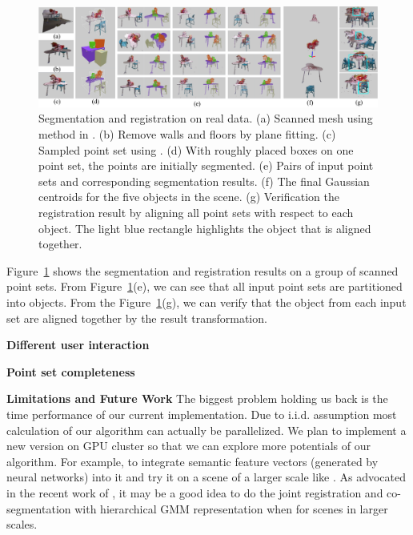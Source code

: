 \begin{figure}[htb]
	\centering
	\includegraphics[width=\linewidth]{images/realdata/realdata}
	\caption{\label{fig:realdata} Segmentation and registration on real data. (a) Scanned mesh using method in \cite{VXH}. (b) Remove walls and floors by plane fitting. (c) Sampled point set using \cite{PossionSampling}. (d) With roughly placed boxes on one point set, the points are initially segmented.  (e) Pairs of input point sets and corresponding segmentation results. (f) The final Gaussian centroids for the five objects in the scene. (g) Verification the registration result by aligning all point sets with respect to each object. The light blue rectangle highlights the object that is aligned together.   }
\end{figure}


Figure~{\ref{fig:realdata}} shows the segmentation and registration results on a group of scanned point sets.
From Figure~\ref{fig:realdata}(e), we can see that all input point sets are partitioned into objects. From the Figure~\ref{fig:realdata}(g), we can verify that the object from each input set are aligned together by the result transformation.  


\textbf{Different user interaction}

\textbf{Point set completeness}

 
\noindent\textbf{Limitations and Future Work}
The biggest problem holding us back is the time performance of our current implementation.  Due to i.i.d. assumption most calculation of our algorithm can actually be parallelized. We plan to implement a new version on GPU cluster so that we can explore more potentials of our algorithm. 
For example, to integrate semantic feature vectors (generated by neural networks) into it and try it on a scene of a larger scale like \cite{GOGMA}. 
As advocated in the recent work of \cite{AGM}, it may be a good idea to do the joint registration and co-segmentation with hierarchical GMM representation when for scenes in larger scales. 
